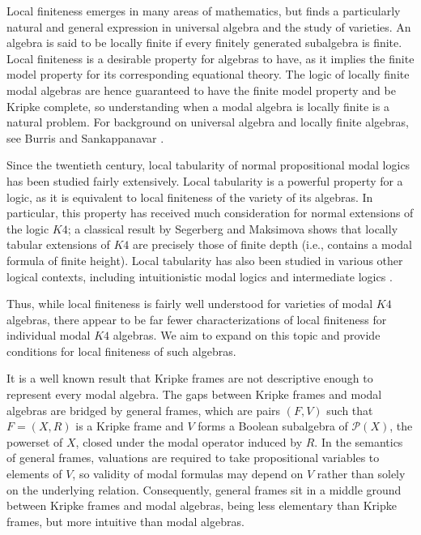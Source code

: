 \documentclass[submission]{eptcs}
\begin{document}
Local finiteness emerges in many areas of mathematics, but finds a particularly natural and general expression in universal algebra and the study of varieties.
An algebra is said to be locally finite if every finitely generated subalgebra is finite. 
Local finiteness is a desirable property for algebras to have, as it implies the finite model property for its corresponding equational theory.
The logic of locally finite modal algebras are hence guaranteed to have the finite model property and be Kripke complete,
so understanding when a modal algebra is locally finite is a natural problem.
For background on universal algebra and locally finite algebras, see Burris and Sankappanavar \cite{Burris_Sankappanavar_1981}.
\par
Since the twentieth century, local tabularity of normal propositional modal logics has been studied fairly extensively.
Local tabularity is a powerful property for a logic, as it is equivalent to local finiteness of the variety of its algebras.
In particular, this property has received much consideration for normal extensions of the logic $K4$; a classical result by Segerberg \cite{Segerberg_1971} and Maksimova \cite{Maksimova_1975} shows that locally tabular extensions of $K4$ are precisely those of finite depth (i.e., contains a modal formula of finite height).
Local tabularity has also been studied in various other logical contexts, including intuitionistic modal logics \cite{Bezhanishvili_Grigolia_2005} and intermediate logics \cite{Kuznetsov_1971}. 
\par
Thus, while local finiteness is fairly well understood for varieties of modal $K4$ algebras,
there appear to be far fewer characterizations of local finiteness for individual modal $K4$ algebras.
We aim to expand on this topic and provide conditions for local finiteness of such algebras.
\par
It is a well known result that Kripke frames are not descriptive enough to represent every modal algebra.
The gaps between Kripke frames and modal algebras are bridged by general frames, which are pairs $(F,V)$ such that $F=(X,R)$ is a Kripke frame and $V$ forms a Boolean subalgebra of $\mathcal{P}(X)$, the powerset of $X$, closed under the modal operator induced by $R$.
In the semantics of general frames, valuations are required to take propositional variables to elements of $V$, so validity of modal formulas may depend on $V$ rather than solely on the underlying relation.
Consequently, general frames sit in a middle ground between Kripke frames and modal algebras, being less elementary than Kripke frames, but more intuitive than modal algebras.
\end{document}
